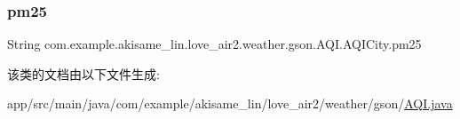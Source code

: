 \subsubsection{\texorpdfstring{pm25}{pm25}}
{\footnotesize\ttfamily String com.\+example.\+akisame\+\_\+lin.\+love\+\_\+air2.\+weather.\+gson.\+A\+Q\+I.\+A\+Q\+I\+City.\+pm25}



该类的文档由以下文件生成\+:\begin{DoxyCompactItemize}
\item 
app/src/main/java/com/example/akisame\+\_\+lin/love\+\_\+air2/weather/gson/\mbox{\hyperlink{java_2com_2example_2akisame__lin_2love__air2_2weather_2gson_2_a_q_i_8java}{A\+Q\+I.\+java}}\end{DoxyCompactItemize}
